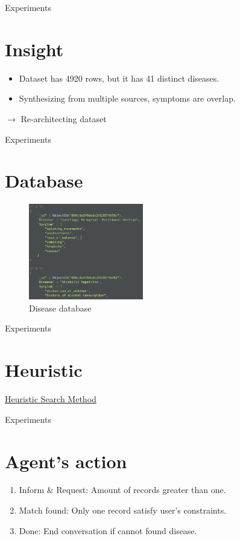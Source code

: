 \documentclass[10pt]{beamer}
\begin{document}
\begin{frame}{Experiments}
    \section{Insight}
    \begin{itemize}
    	\item Dataset has 4920 rows, but it has 41 distinct diseases.
    	\item Synthesizing from multiple sources, symptoms are overlap.
    \end{itemize}
	$\rightarrow$ Re-architecting dataset
\end{frame}


\begin{frame}{Experiments}
    \section{Database}
    \begin{figure}[H]
    \centering
    \includegraphics[width=5cm]{image/dbms.png}
    \caption{Disease database}
    \label{fig:di_dbms}
    \end{figure}
\end{frame}

\begin{frame}{Experiments}
    \section{Heuristic}
    \begin{center}
    	\href{https://1drv.ms/u/s!AvgPPwEWTrewcyU0vohmLsytm_4?e=tFHl7o}{Heuristic Search Method}
   	\end{center}
	
\end{frame}

\begin{frame}{Experiments}
    \section{Agent's action}
    \begin{enumerate}
        \item Inform \& Request: Amount of records greater than one.
        \item Match found: Only one record satisfy user's constraints.
        \item Done: End conversation if cannot found disease.
    \end{enumerate}
\end{frame}
\end{document}
